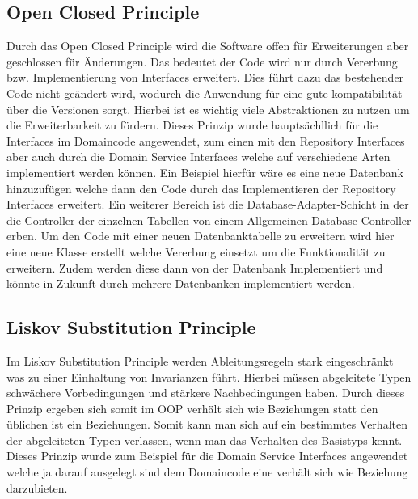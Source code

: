 \subsection{Open Closed Principle}
Durch das Open Closed Principle wird die Software offen für Erweiterungen aber geschlossen für Änderungen.
Das bedeutet der Code wird nur durch Vererbung bzw. Implementierung von Interfaces erweitert.
Dies führt dazu das bestehender Code nicht geändert wird, wodurch die Anwendung für eine gute kompatibilität über die Versionen sorgt.
Hierbei ist es wichtig viele Abstraktionen zu nutzen um die Erweiterbarkeit zu fördern.
Dieses Prinzip wurde hauptsächllich für die Interfaces im Domaincode angewendet, zum einen mit den Repository Interfaces aber auch durch die Domain Service Interfaces
welche auf verschiedene Arten implementiert werden können.
Ein Beispiel hierfür wäre es eine neue Datenbank hinzuzufügen welche dann den Code durch das Implementieren der Repository Interfaces erweitert.
Ein weiterer Bereich ist die Database-Adapter-Schicht in der die Controller der einzelnen Tabellen von einem Allgemeinen Database Controller erben.
Um den Code mit einer neuen Datenbanktabelle zu erweitern wird hier eine neue Klasse erstellt welche Vererbung einsetzt um die Funktionalität zu erweitern.
Zudem werden diese dann von der Datenbank Implementiert und könnte in Zukunft durch mehrere Datenbanken implementiert werden.

\newpage
\subsection{Liskov Substitution Principle}
Im Liskov Substitution Principle werden Ableitungsregeln stark eingeschränkt was zu einer Einhaltung von Invarianzen führt.
Hierbei müssen abgeleitete Typen schwächere Vorbedingungen und stärkere Nachbedingungen haben.
Durch dieses Prinzip ergeben sich somit im OOP \glqq verhält sich wie\grqq{} Beziehungen statt den üblichen \glqq ist ein\grqq{} Beziehungen.
Somit kann man sich auf ein bestimmtes Verhalten der abgeleiteten Typen verlassen, wenn man das Verhalten des Basistyps kennt.
Dieses Prinzip wurde zum Beispiel für die Domain Service Interfaces angewendet welche ja darauf ausgelegt sind dem Domaincode eine \glqq verhält sich wie\grqq{} Beziehung darzubieten.

